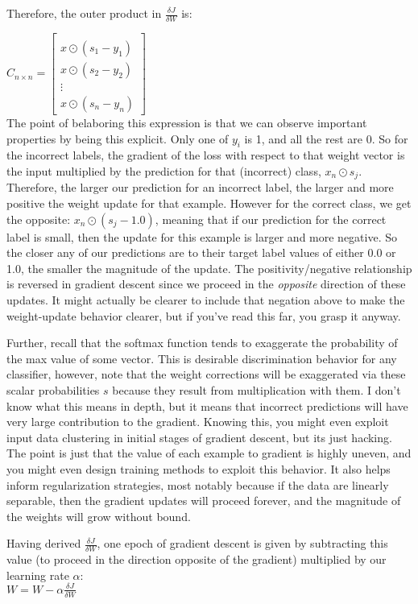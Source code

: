 \documentclass{article}
\begin{document}
Therefore, the outer product in $\frac{\delta J}{\delta W}$ is:

$C_{n \times n} = \begin{bmatrix} \\
         x \odot (s_{1} - y_{1}) \\
         x \odot (s_{2} - y_{2}) \\
          \vdots \\
         x \odot (s_{n} - y_{n})
         \end{bmatrix}
$ \\

The point of belaboring this expression is that we can observe important properties by being this explicit. Only one of $y_{i}$ is 1, and all the rest are 0. So for the incorrect labels, the gradient of the loss with respect to that weight vector is the input multiplied by the prediction for that (incorrect) class, $x_{n} \odot s_{j}$. Therefore, the larger our prediction for an incorrect label, the larger and more positive the weight update for that example. However for the correct class, we get the opposite: $x_{n} \odot (s_{j} - 1.0)$, meaning that if our prediction for the correct label is small, then the update for this example is larger and more negative. So the closer any of our predictions are to their target label values of either 0.0 or 1.0, the smaller the magnitude of the update. The positivity/negative relationship is reversed in gradient descent since we proceed in the \textit{opposite} direction of these updates. It might actually be clearer to include that negation above to make the weight-update behavior clearer, but if you've read this far, you grasp it anyway.

Further, recall that the softmax function tends to exaggerate the probability of the max value of some vector. This is desirable discrimination behavior for any classifier, however, note that the weight corrections will be exaggerated via these scalar probabilities $s$ because they result from multiplication with them. I don't know what this means in depth, but it means that incorrect predictions will have very large contribution to the gradient. Knowing this, you might even exploit input data clustering in initial stages of gradient descent, but its just hacking. The point is just that the value of each example to gradient is highly uneven, and you might even design training methods to exploit this behavior. It also helps inform regularization strategies, most notably because if the data are linearly separable, then the gradient updates will proceed forever, and the magnitude of the weights will grow without bound.


Having derived $\frac{\delta J}{\delta W}$, one epoch of gradient descent is given by subtracting this value (to proceed in the direction opposite of the gradient) multiplied by our learning rate $\alpha$: \\

$ W = W - \alpha \frac{\delta J}{\delta W}$
\end{document}
